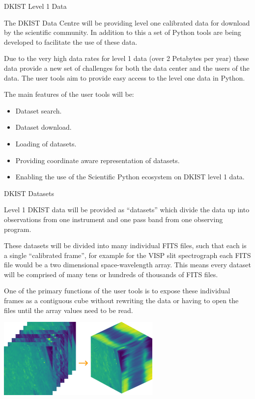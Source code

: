 \documentclass[a0paper,landscape,fontscale=0.3]{baposter}
\begin{document}
\begin{poster}
 
\begin{posterbox}[name=intro,column=0,row=0,span=2]{DKIST Level 1 Data}

  The DKIST Data Centre will be providing level one calibrated data for download
  by the scientific community. In addition to this a set of Python tools are
  being developed to facilitate the use of these data.

  Due to the very high data rates for level 1 data (over 2 Petabytes per year)
  these data provide a new set of challenges for both the data center and the
  users of the data. The user tools aim to provide easy access to the level one
  data in Python.

  The main features of the user tools will be:
  \begin{itemize}
  \item Dataset search.
  \item Dataset download.
  \item Loading of datasets.
  \item Providing coordinate aware representation of datasets.
  \item Enabling the use of the Scientific Python ecosystem on DKIST level 1
    data.
  \end{itemize}

\end{posterbox}

\begin{posterbox}[name=dataset,column=0,row=0,span=1,below=intro]{DKIST Datasets}

  Level 1 DKIST data will be provided as ``datasets'' which divide the data up
  into observations from one instrument and one pass band from one observing
  program.

  These datasets will be divided into many individual FITS files, such that each
  is a single ``calibrated frame'', for example for the VISP slit spectrograph
  each FITS file would be a two dimensional space-wavelength array. This means
  every dataset will be comprised of many tens or hundreds of thousands of FITS
  files.

  One of the primary functions of the user tools is to expose these individual
  frames as a contiguous cube without rewriting the data or having to open the
  files until the array values need to be read.
  
  \begin{center}
    \includegraphics[width=0.6\textwidth]{sequence_and_cube.png}\\[0.4em]
  \end{center}


\end{posterbox}
\end{poster}
\end{document}
